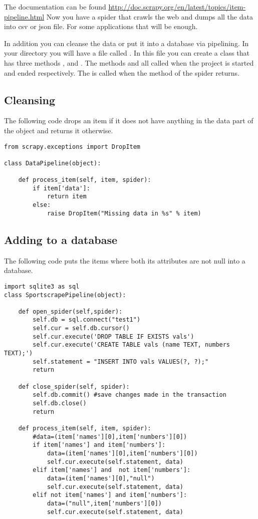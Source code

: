 The documentation can be found \url{http://doc.scrapy.org/en/latest/topics/item-pipeline.html}
Now you have a spider that crawls the web and dumps all the data into csv or json file. For some applications that will be enough. 

In addition you can cleanse the data or put it into a database via pipelining. In your directory  you will have a file called . In this file you can create a class that has three methods ,  and . The methods  and  all called when the project is started and ended respectively. The  is called when the  method of the spider returns. 

\subsection*{Cleansing}

The following code drops an item if it does not have anything in the data part of the object and returns it otherwise.

\begin{lstlisting}
from scrapy.exceptions import DropItem

class DataPipeline(object):

    def process_item(self, item, spider):
        if item['data']:
            return item
        else:
            raise DropItem("Missing data in %s" % item)
\end{lstlisting}

\subsection*{Adding to a database}
The following code puts the items where both its attributes are not null into a database. 
\begin{lstlisting}
import sqlite3 as sql
class SportscrapePipeline(object):
	
	def open_spider(self,spider):
		self.db = sql.connect("test1")
		self.cur = self.db.cursor()
		self.cur.execute('DROP TABLE IF EXISTS vals')
		self.cur.execute('CREATE TABLE vals (name TEXT, numbers TEXT);')
		self.statement = "INSERT INTO vals VALUES(?, ?);"
		return

	def close_spider(self, spider):
		self.db.commit() #save changes made in the transaction
		self.db.close()
		return

	def process_item(self, item, spider):
		#data=(item['names'][0],item['numbers'][0])
		if item['names'] and item['numbers']:
			data=(item['names'][0],item['numbers'][0])
			self.cur.execute(self.statement, data)
		elif item['names'] and  not item['numbers']:
			data=(item['names'][0],"null")
			self.cur.execute(self.statement, data)
		elif not item['names'] and item['numbers']:
			data=("null",item['numbers'][0])
			self.cur.execute(self.statement, data)
\end{lstlisting}

